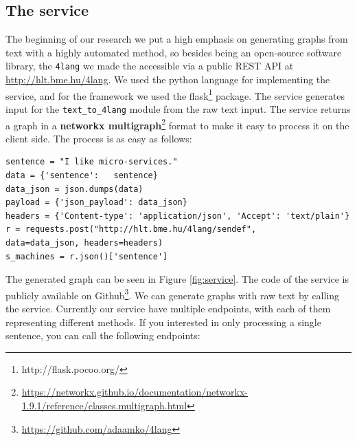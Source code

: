 \subsection{The service}
The beginning of our research we put a high emphasis on generating graphs from text with a highly automated method, so besides being an open-source software library,
the \texttt{4lang} we made the accessible via a public
REST API at \url{http://hlt.bme.hu/4lang}. We used the python language for implementing the service, and for the framework we used the flask\footnote{http://flask.pocoo.org/} package. The service generates input for the \texttt{text\_to\_4lang} module from the raw text input. The service returns a graph in a \textbf{networkx multigraph}\footnote{\url{https://networkx.github.io/documentation/networkx-1.9.1/reference/classes.multigraph.html}} format to make it easy to process it on the client side. The process is as easy as follows:
\begin{center}
	\begin{lstlisting}
sentence = "I like micro-services." 
data = {'sentence':   sentence}
data_json = json.dumps(data)
payload = {'json_payload': data_json}
headers = {'Content-type': 'application/json', 'Accept': 'text/plain'}
r = requests.post("http://hlt.bme.hu/4lang/sendef", 
data=data_json, headers=headers)
s_machines = r.json()['sentence']
\end{lstlisting}
\end{center}


The generated graph can be seen in Figure \ref{fig:service}. The code of the service is publicly available on Github\footnote{\url{https://github.com/adaamko/4lang}}. We can generate graphs with raw text by calling the service. Currently our service have multiple endpoints, with each of them representing different methods.
If you interested in only processing a single sentence, you can call the following endpoints:

